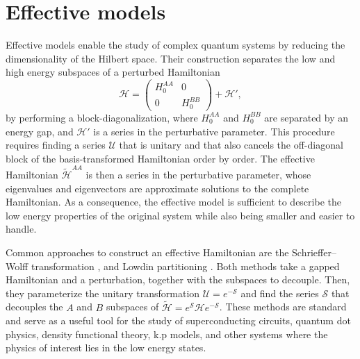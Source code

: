 \section{Effective models}

Effective models enable the study of complex quantum systems by reducing the
dimensionality of the Hilbert space.
Their construction separates the low and high energy subspaces of a
perturbed Hamiltonian
%
\begin{equation}
    \mathcal{H} = \begin{pmatrix}H_0^{AA} & 0 \\ 0 & H_0^{BB}\end{pmatrix} + \mathcal{H}',
\end{equation}
%
by performing a block-diagonalization, where $H_0^{AA}$ and $H_0^{BB}$ are
separated by an energy gap, and $\mathcal{H}'$ is a series in the perturbative
parameter.
This procedure requires finding a series $\mathcal{U}$ that is unitary and
that also cancels the off-diagonal block of the basis-transformed Hamiltonian
order by order.
The effective Hamiltonian $\tilde{\mathcal{H}}^{AA}$ is then a series in the
perturbative parameter, whose eigenvalues and eigenvectors are approximate
solutions to the complete Hamiltonian.
As a consequence, the effective model is sufficient to describe the low energy
properties of the original system while also being smaller and easier to
handle.

Common approaches to construct an effective Hamiltonian are the
Schrieffer--Wolff transformation \cite{Schrieffer_1966}, \cite{Bravyi_2011} and
Lowdin partitioning \cite{White_1950}.
Both methods take a gapped Hamiltonian and a perturbation, together with the
subspaces to decouple.
Then, they parameterize the unitary transformation $\mathcal{U} =
e^{-\mathcal{S}}$ and find the series $\mathcal{S}$ that decouples the $A$ and
$B$ subspaces of $\tilde{\mathcal{H}} =
e^{\mathcal{S}}\mathcal{H}e^{-\mathcal{S}}$.
These methods are standard and serve as a useful tool for the study of
superconducting circuits, quantum dot physics, density functional theory, k.p
models, and other systems where the physics of interest lies in the low energy
states.


